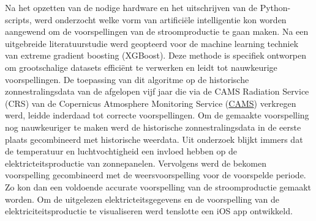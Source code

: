 Na het opzetten van de nodige hardware en het uitschrijven van de Python-scripts, werd onderzocht welke vorm van artificiële intelligentie kon worden aangewend om de voorspellingen van de stroomproductie te gaan maken. Na een uitgebreide literatuurstudie werd geopteerd voor de machine learning techniek van extreme gradient boosting (XGBoost). Deze methode is specifiek ontworpen om grootschalige datasets efficiënt te verwerken en leidt tot nauwkeurige voorspellingen. De toepassing van dit algoritme op de historische zonnestralingsdata van de afgelopen vijf jaar die via de CAMS Radiation Service (CRS) van de Copernicus Atmosphere Monitoring Service (\href{https://atmosphere.copernicus.eu}{CAMS}) verkregen werd, leidde inderdaad tot correcte voorspellingen. Om de gemaakte voorspelling nog nauwkeuriger te maken werd de historische zonnestralingsdata in de eerste plaats gecombineerd met historische weerdata. Uit onderzoek blijkt immers dat de temperatuur en luchtvochtigheid een invloed hebben op de elektricteitsproductie van zonnepanelen. Vervolgens werd de bekomen voorspelling gecombineerd met de weersvoorspelling voor de voorspelde periode. Zo kon dan een voldoende accurate voorspelling van de stroomproductie gemaakt worden. Om de uitgelezen elektricteitsgegevens en de voorspelling van de elektriciteitsproductie te visualiseren werd tenslotte een iOS app ontwikkeld. \\

